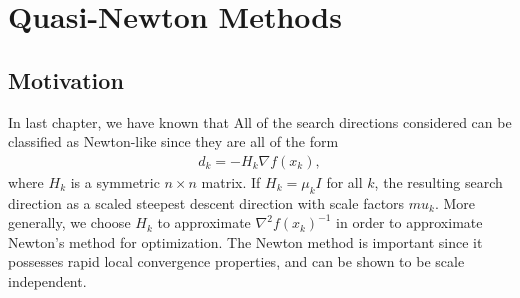 \chapter{Quasi-Newton Methods}\label{chp:Quasi-Newton Methods}

\section{Motivation}


In last chapter, we have known that All of the search directions considered can be classified as Newton-like since they are all of
the form 
\begin{align*}
    d_k = -H_k\nabla f(x_k),
\end{align*}
where $H_k$ is a symmetric $n\times n$ matrix. If $H_k=\mu_k I$ for all $k$, the resulting search direction as a scaled steepest descent direction
with scale factors $mu_k$. More generally, we choose $H_k$ to approximate $\nabla^2 f(x_k)^{-1}$ in 
order to approximate Newton's method for optimization. The Newton method is important since it possesses rapid local convergence properties, and can be shown
to be scale independent. 

